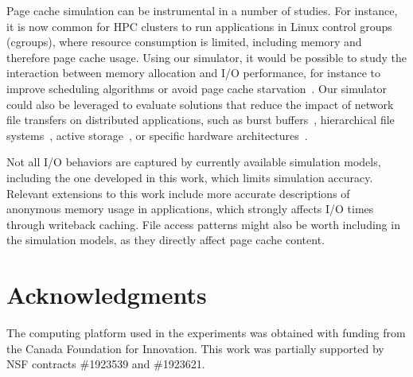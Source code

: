 \documentclass[conference]{IEEEtran}
\begin{document}
    Page cache simulation can be instrumental in a number of studies. For
    instance, it is now common for HPC clusters to run applications in
    Linux control groups (cgroups), where resource consumption is limited,
    including memory and therefore page cache usage. Using our simulator,
    it would be possible to study the interaction between memory allocation
    and I/O performance, for instance to improve scheduling algorithms or
    avoid page cache starvation~\cite{zhuang2017}. Our simulator could also
    be leveraged to evaluate solutions that reduce the impact of network
    file transfers on distributed applications, such as burst
    buffers~\cite{ferreiradasilva-fgcs-bb-2019}, hierarchical file
    systems~\cite{islam2015triple}, active storage~\cite{5496981}, or
    specific hardware architectures~\cite{hayot2020performance}. 

    Not all I/O behaviors are captured by currently available simulation models,
    including the one developed in this work, 
    which limits simulation accuracy.
    Relevant extensions to this work include more
    accurate descriptions of anonymous memory usage in applications, 
    which strongly affects I/O times through writeback caching. File access patterns
    might also be worth including in the simulation models,
    as they directly affect page cache content.


    \section{Acknowledgments}
    The computing platform used in the experiments was obtained with funding
    from the Canada Foundation for Innovation. This work was partially supported
    by NSF contracts \#1923539 and \#1923621.
    

\clearpage


\end{document}
